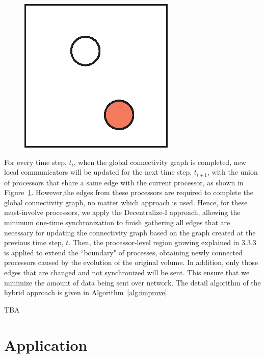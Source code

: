 \documentclass[10pt, conference, compsocconf]{IEEEtran}
\begin{document}
\begin{figure}[ht]
\centering
\includegraphics[width=0.45\linewidth]{blank.png}
\caption{}
\label{fig:improve}
\end{figure}

For every time step, $t_i$, when the global connectivity graph is completed, new local communicators will be updated for the next time step, $t_{i+1}$, with the union of processors that share a same edge with the current processor, as shown in Figure~\ref{fig:improve}. However,the edges from these processors are required to complete the global connectivity graph, no matter which approach is used. Hence, for these must-involve processors, we apply the Decentralize-I approach, allowing the minimum one-time synchronization to finish gathering all edges that are necessary for updating the connectivity graph based on the graph created at the previous time step, $t$. Then, the processor-level region growing explained in 3.3.3 is applied to extend the ``boundary" of processes, obtaining newly connected processors caused by the evolution of the original volume. In addition, only those edges that are changed and not synchronized will be sent. This ensure that we minimize the amount of data being sent over network.
The detail algorithm of the hybrid approach is given in Algorithm~\ref{alg:improve}.

\begin{algorithm}
\caption{TBA}
\label{alg:improve}
\begin{algorithmic}[1]
\STATE	
\end{algorithmic}
\end{algorithm}

\section{Application}
\end{document}
